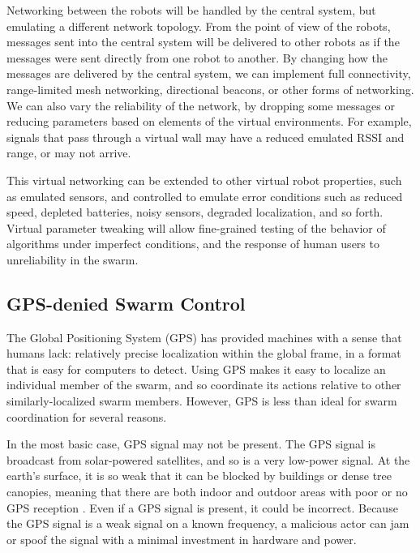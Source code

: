 \documentclass[]{article}
\begin{document}
Networking between the robots will be handled by the central system, but emulating a different network topology. 
From the point of view of the robots, messages sent into the central system will be delivered to other robots as if the messages were sent directly from one robot to another. 
By changing how the messages are delivered by the central system, we can implement full connectivity, range-limited mesh networking, directional beacons, or other forms of networking. 
We can also vary the reliability of the network, by dropping some messages or reducing parameters based on elements of the virtual environments. 
For example, signals that pass through a virtual wall may have a reduced emulated RSSI and range, or may not arrive. 

This virtual networking can be extended to other virtual robot properties, such as emulated sensors, and controlled to emulate error conditions such as reduced speed, depleted batteries, noisy sensors, degraded localization, and so forth.
Virtual parameter tweaking will allow fine-grained testing of the behavior of algorithms under imperfect conditions, and the response of human users to unreliability in the swarm. 

\subsection{GPS-denied Swarm Control}

The Global Positioning System (GPS) has provided machines with a sense that humans lack: relatively precise localization within the global frame, in a format that is easy for computers to detect.
Using GPS makes it easy to localize an individual member of the swarm, and so coordinate its actions relative to other similarly-localized swarm members. 
However, GPS is less than ideal for swarm coordination for several reasons. 

In the most basic case, GPS signal may not be present. 
The GPS signal is broadcast from solar-powered satellites, and so is a very low-power signal.
At the earth's surface, it is so weak that it can be blocked by buildings or dense tree canopies, meaning that there are both indoor and outdoor areas with poor or no GPS reception \cite{zheng2005quantitative}. 
Even if a GPS signal is present, it could be incorrect. 
Because the GPS signal is a weak signal on a known frequency, a malicious actor can jam or spoof the signal with a minimal investment in hardware and power\cite{montgomery2009receiver}.
\end{document}
